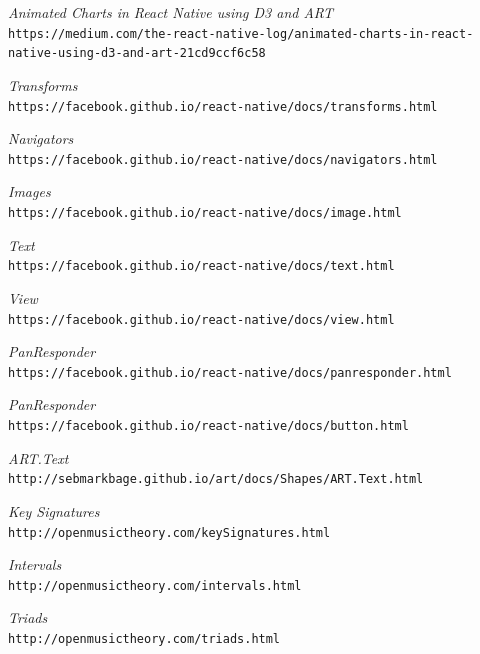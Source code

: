 \documentclass[onecolumn, draftclsnofoot,10pt, compsoc]{IEEEtran}
\begin{document}
%
%

\begin{thebibliography}{9}

  \textit{Animated Charts in React Native using D3 and ART}
  \\\texttt{{https://medium.com/the-react-native-log/animated-charts-in-react-native-using-d3-and-art-21cd9ccf6c58}}

  \textit {Transforms}
  \\\texttt {{https://facebook.github.io/react-native/docs/transforms.html}}


  \textit {Navigators}
  \\\texttt {{https://facebook.github.io/react-native/docs/navigators.html}}

  \textit {Images}
  \\\texttt {{https://facebook.github.io/react-native/docs/image.html}}

  \textit {Text}
  \\\texttt {{https://facebook.github.io/react-native/docs/text.html}}

  \textit {View}
  \\\texttt {{https://facebook.github.io/react-native/docs/view.html}}

  \textit {PanResponder}
  \\\texttt {{https://facebook.github.io/react-native/docs/panresponder.html}}

  \textit {PanResponder}
  \\\texttt {{https://facebook.github.io/react-native/docs/button.html}}

  \textit {ART.Text}
  \\\texttt {{http://sebmarkbage.github.io/art/docs/Shapes/ART.Text.html}}

  \textit {Key Signatures}
  \\\texttt {{http://openmusictheory.com/keySignatures.html}}

  \textit {Intervals}
  \\\texttt {{http://openmusictheory.com/intervals.html}}

  \textit {Triads}
  \\\texttt {{http://openmusictheory.com/triads.html}}

\end{thebibliography}
\end{document}
